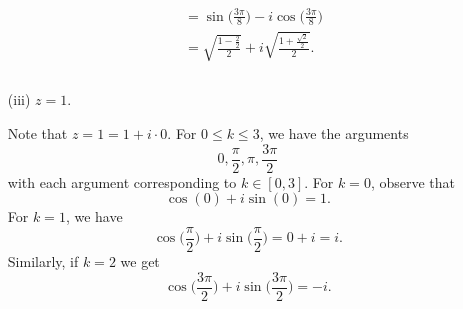 \documentclass[a4paper]{article}
\begin{document}
\begin{enumerate}
\begin{solution}
\begin{align*}
                                                                                                           &= \sin \Big(  \frac{ 3 \pi  }{  8  }  \Big) - i \cos \Big(  \frac{ 3 \pi  }{ 8  }  \Big) \\
                                                                                                           &= \sqrt{ \frac{ 1 - \frac{ 2  }{ 2 }  }{ 2 }  }  + i \sqrt{ \frac{ 1 + \frac{ \sqrt{ 2 }  }{ 2 }  }{ 2 }  }.
                \end{align*}
                \begin{align*}
                    & \\
                \end{align*}
                \end{solution}
            \item[(iii)] \( z = 1  \).
                \begin{solution}
                Note that \( z = 1 = 1 + i \cdot 0  \). For \( 0 \leq k \leq 3  \), we have the arguments
                \[  0 , \frac{ \pi }{ 2 },  \pi, \frac{ 3 \pi  }{  2  }   \]
                with each argument corresponding to \( k \in [0,3]  \). For \( k = 0  \), observe that 
                \[  \cos(0) + i \sin (0) = 1.  \]
                For \( k = 1  \), we have 
                \[ \cos \Big(  \frac{ \pi }{ 2 }  \Big) + i \sin \Big(  \frac{ \pi }{ 2 }  \Big) = 0 + i = i.   \]
                Similarly, if \( k = 2  \) we get  
                \[ \cos \Big(  \frac{ 3 \pi  }{ 2 }  \Big) + i \sin \Big(  \frac{ 3 \pi }{ 2 }  \Big) = - i.   \]




\end{solution}
\end{enumerate}
\end{document}
